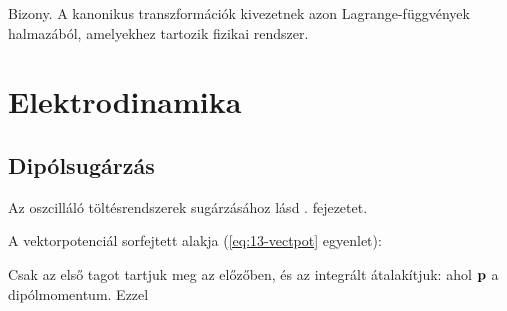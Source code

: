     Bizony. A kanonikus transzformációk kivezetnek azon Lagrange-függvények halmazából, amelyekhez tartozik fizikai rendszer. 
    
 
 \section{Elektrodinamika}
  
  \subsection{Dipólsugárzás}
   
   Az oszcilláló töltésrendszerek sugárzásához lásd . fejezetet.
   
   A vektorpotenciál sorfejtett alakja (\eqref{eq:13-vectpot} egyenlet):
   
   Csak az első tagot tartjuk meg az előzőben, és az integrált átalakítjuk:
   ahol $\mathbf{p}$ a dipólmomentum. Ezzel
   
